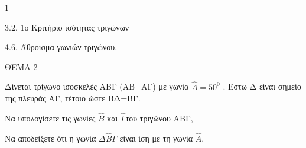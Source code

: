 \begin{ylh}{1}
    \item 3.2. 1ο Κριτήριο ισότητας τριγώνων
    \item 4.6. Άθροισμα γωνιών τριγώνου.
\end{ylh}

ΘΕΜΑ 2

Δίνεται τρίγωνο ισοσκελές ΑΒΓ (ΑΒ=ΑΓ) με γωνία $\widehat{Α} = 50^{0}$ . Έστω Δ είναι σημείο της πλευράς ΑΓ, τέτοιο ώστε ΒΔ=ΒΓ.

\begin{alist}
\item Να υπολογίσετε τις γωνίες $\widehat{Β}$ και $\widehat{\Gamma}$του τριγώνου ΑΒΓ, 

\item Να αποδείξετε ότι η γωνία $\Delta\widehat{Β}\Gamma$ είναι ίση με τη γωνία $\widehat{Α}$. 


\begin{center}
\end{center}
\end{alist}
